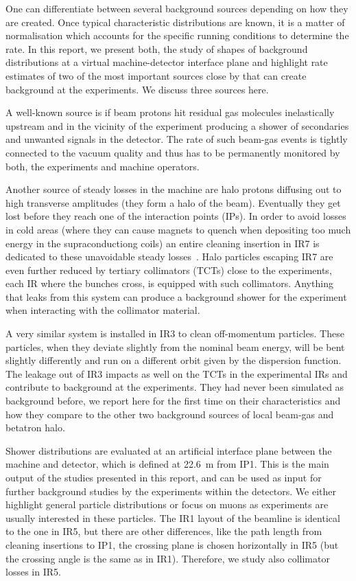 One can differentiate between several background sources depending on how they are created. Once typical characteristic distributions are known, it is a matter of normalisation which accounts for the specific running conditions to determine the rate. In this report, we present both, the study of shapes of background distributions at a virtual machine-detector interface plane and highlight rate estimates of two of the most important sources close by that can create background at the experiments. We discuss three sources here.

A well-known source is if beam protons hit residual gas molecules inelastically upstream and in the vicinity of the experiment producing a shower of secondaries and unwanted signals in the detector. The rate of such beam-gas events is tightly connected to the vacuum quality and thus has to be permanently monitored by both, the experiments and machine operators.

Another source of steady losses in the machine are halo protons diffusing out to high transverse amplitudes (they form a halo of the beam). Eventually they get lost before they reach one of the interaction points (IPs). In order to avoid losses in cold areas (where they can cause magnets to quench when depositing too much energy in the supraconductiong coils) an entire cleaning insertion in IR7 is dedicated to these unavoidable steady losses~\cite{LHCDesignRep,assmann05chamonix}. Halo particles escaping IR7 are even further reduced by tertiary collimators (TCTs) close to the experiments, each IR where the bunches cross, is equipped with such collimators. Anything that leaks from this system can produce a background shower for the experiment when interacting with the collimator material. 

A very similar system is installed in IR3 to clean off-momentum particles. These particles, when they deviate slightly from the nominal beam energy, will be bent slightly differently and run on a different orbit given by the dispersion function. The leakage out of IR3 impacts as well on the TCTs in the experimental IRs and contribute to background at the experiments. They had never been simulated as background before, we report here for the first time on their characteristics and how they compare to the other two background sources of local beam-gas and betatron halo. 

Shower distributions are evaluated at an artificial interface plane between the machine and detector, which is defined at 22.6~m from IP1. This is the main output of the studies presented in this report, and can be used as input for further background studies by the experiments within the detectors. We either highlight general particle distributions or focus on muons as experiments are usually interested in these particles. The IR1 layout of the beamline is identical to the one in IR5, but there are other differences, like the path length from cleaning insertions to IP1, the crossing plane is chosen horizontally in IR5 (but the crossing angle is the same as in IR1). Therefore, we study also collimator losses in IR5.


